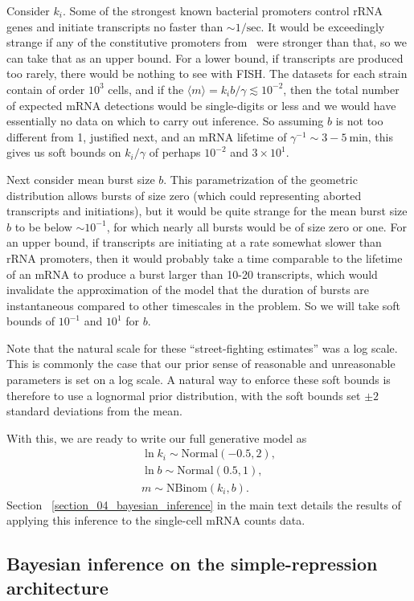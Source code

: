 Consider $k_i$. Some of the strongest known bacterial promoters control rRNA
genes and initiate transcripts no faster than $\sim 1/\text{sec}$. It would be
exceedingly strange if any of the constitutive promoters from~\cite{Jones2014}
were stronger than that, so we can take that as an upper bound. For a lower
bound, if transcripts are produced too rarely, there would be nothing to see
with FISH. The datasets for each strain contain of order $10^3$ cells, and if
the $\langle m \rangle = k_i b/\gamma \lesssim 10^{-2}$, then the total number
of expected mRNA detections would be single-digits or less and we would have
essentially no data on which to carry out inference. So assuming $b$ is not too
different from 1, justified next, and an mRNA lifetime of $\gamma^{-1}\sim
3-5~\text{min}$, this gives us soft bounds on $k_i/\gamma$ of perhaps $10^{-2}$
and $3\times 10^1$.

Next consider mean burst size $b$. This parametrization of the geometric
distribution allows bursts of size zero (which could representing aborted
transcripts and initiations), but it would be quite strange for the mean burst
size $b$ to be below $\sim10^{-1}$, for which nearly all bursts would be of size
zero or one. For an upper bound, if transcripts are initiating at a rate
somewhat slower than rRNA promoters, then it would probably take a time
comparable to the lifetime of an mRNA to produce a burst larger than 10-20
transcripts, which would invalidate the approximation of the model that the
duration of bursts are instantaneous compared to other timescales in the
problem. So we will take soft bounds of $10^{-1}$ and $10^1$ for $b$.

Note that the natural scale for these ``street-fighting estimates'' was a log
scale. This is commonly the case that our prior sense of reasonable and
unreasonable parameters is set on a log scale. A natural way to enforce these
soft bounds is therefore to use a lognormal prior distribution, with the soft
bounds set $\pm2$ standard deviations from the mean.

With this, we are ready to write our full generative model as
\begin{equation}
\begin{split}
\ln k_i \sim \text{Normal}(-0.5, 2),
\\
\ln b \sim \text{Normal}(0.5, 1),
\\
m \sim \text{NBinom}(k_i, b).
\end{split}
\end{equation}
Section ~\ref{section_04_bayesian_inference} in the main text details the
results of applying this inference to the single-cell mRNA counts data.

\subsection{Bayesian inference on the simple-repression architecture}
